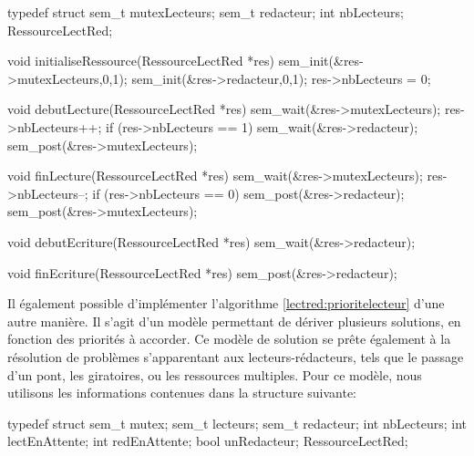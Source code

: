 \begin{codeblock}[title={Lecteurs-rédacteurs: priorité aux lecteurs si une lecture est en cours},label=lectred:prioritelecteurcourant]
  typedef struct {
      sem_t mutexLecteurs;
      sem_t redacteur;
      int nbLecteurs;
    } RessourceLectRed;

  void initialiseRessource(RessourceLectRed *res) {
      sem_init(&res->mutexLecteurs,0,1);
      sem_init(&res->redacteur,0,1);
      res->nbLecteurs = 0;
    }

  void debutLecture(RessourceLectRed *res) {
      sem_wait(&res->mutexLecteurs);
      res->nbLecteurs++;
      if (res->nbLecteurs == 1)
      sem_wait(&res->redacteur);
      sem_post(&res->mutexLecteurs);
    }

  void finLecture(RessourceLectRed *res) {
      sem_wait(&res->mutexLecteurs);
      res->nbLecteurs--;
      if (res->nbLecteurs == 0)
      sem_post(&res->redacteur);
      sem_post(&res->mutexLecteurs);
    }

  void debutEcriture(RessourceLectRed *res) {
      sem_wait(&res->redacteur);
    }

  void finEcriture(RessourceLectRed *res) {
      sem_post(&res->redacteur);
    }
\end{codeblock}

Il également possible d'implémenter l'algorithme \ref{lectred:prioritelecteur} d'une autre manière. Il s'agit d'un modèle permettant de dériver plusieurs solutions, en fonction des priorités à accorder. Ce modèle de solution se prête également à la résolution de problèmes s'apparentant aux lecteurs-rédacteurs, tels que le passage d'un pont, les giratoires, ou les ressources multiples. Pour ce modèle, nous utilisons les informations contenues dans la structure suivante:

\begin{codeblock}
  typedef struct {
      sem_t mutex;
      sem_t lecteurs;
      sem_t redacteur;
      int nbLecteurs;
      int lectEnAttente;
      int redEnAttente;
      bool unRedacteur;
    } RessourceLectRed;
\end{codeblock}

